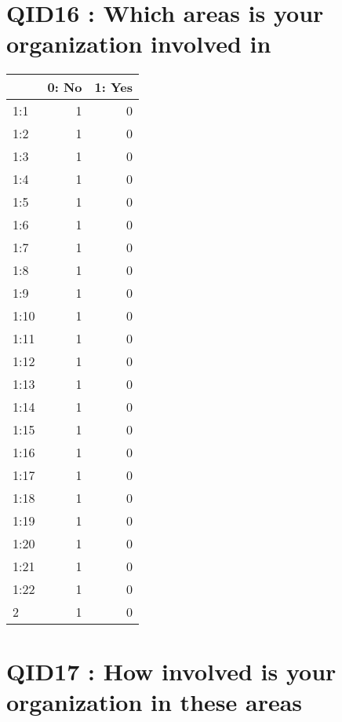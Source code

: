 \documentclass[]{article}
\begin{document}
\section{QID16 : Which areas is your organization involved
in}\label{qid16-which-areas-is-your-organization-involved-in}

\begin{table}[H]
\centering\begingroup\fontsize{30}{32}\selectfont

\begin{tabular}{l|r|r}
\hline
  & 0: No &  1: Yes\\
\hline
1:1 & 1 & 0\\
\hline
1:2 & 1 & 0\\
\hline
1:3 & 1 & 0\\
\hline
1:4 & 1 & 0\\
\hline
1:5 & 1 & 0\\
\hline
1:6 & 1 & 0\\
\hline
1:7 & 1 & 0\\
\hline
1:8 & 1 & 0\\
\hline
1:9 & 1 & 0\\
\hline
1:10 & 1 & 0\\
\hline
1:11 & 1 & 0\\
\hline
1:12 & 1 & 0\\
\hline
1:13 & 1 & 0\\
\hline
1:14 & 1 & 0\\
\hline
1:15 & 1 & 0\\
\hline
1:16 & 1 & 0\\
\hline
1:17 & 1 & 0\\
\hline
1:18 & 1 & 0\\
\hline
1:19 & 1 & 0\\
\hline
1:20 & 1 & 0\\
\hline
1:21 & 1 & 0\\
\hline
1:22 & 1 & 0\\
\hline
2 & 1 & 0\\
\hline
\end{tabular}
\endgroup{}
\end{table}

\section{QID17 : How involved is your organization in these
areas}\label{qid17-how-involved-is-your-organization-in-these-areas}
\end{document}
